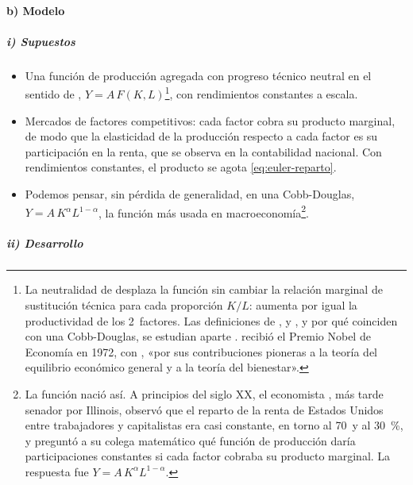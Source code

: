 \documentclass[11pt]{article}
\begin{document}
\paragraph{b) Modelo}

\subparagraph{i) Supuestos}

\begin{itemize}
\item Una función de producción agregada con progreso técnico neutral en el sentido de , $Y=A\,F(K,L)$\footnote{La neutralidad de  desplaza la función sin cambiar la relación marginal de sustitución técnica para cada proporción $K/L$: aumenta por igual la productividad de los 2~factores. Las definiciones de ,  y , y por qué coinciden con una Cobb-Douglas, se estudian aparte .  recibió el Premio Nobel de Economía en 1972, con , «por sus contribuciones pioneras a la teoría del equilibrio económico general y a la teoría del bienestar»\nocite{Nobel1972HicksArrow}.}, con rendimientos constantes a escala.
\item Mercados de factores competitivos: cada factor cobra su producto marginal, de modo que la elasticidad de la producción respecto a cada factor es su participación en la renta, que se observa en la contabilidad nacional. Con rendimientos constantes, el producto se agota \eqref{eq:euler-reparto}.
\item Podemos pensar, sin pérdida de generalidad, en una Cobb-Douglas, $Y=A\,K^{\alpha}L^{1-\alpha}$, la función más usada en macroeconomía\footnote{La función nació así. A principios del siglo XX, el economista , más tarde senador por Illinois, observó que el reparto de la renta de Estados Unidos entre trabajadores y capitalistas era casi constante, en torno al 70~y al 30~\%, y preguntó a su colega matemático  qué función de producción daría participaciones constantes si cada factor cobraba su producto marginal. La respuesta fue $Y=A\,K^{\alpha}L^{1-\alpha}$\nocite{CobbDouglas1928,Douglas1976}.}.
\end{itemize}

\subparagraph{ii) Desarrollo}
\end{document}
